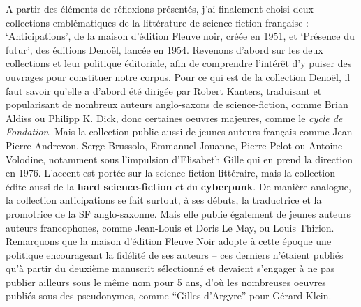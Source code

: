 \documentclass[letterpaper,portrait,12pt]{article}
\begin{document}
\textbf{	}A partir des \'{e}l\'{e}ments de r\'{e}flexions pr\'{e}sent\'{e}s, j'ai finalement choisi deux collections embl\'{e}matiques de la litt\'{e}rature de science fiction fran\c{c}aise : {`}Anticipations', de la maison d'\'{e}dition Fleuve noir, cr\'{e}\'{e}e en 1951, et {`}Pr\'{e}sence du futur', des \'{e}ditions Deno\"{e}l, lanc\'{e}e en 1954. Revenons d'abord sur les deux collections et leur politique \'{e}ditoriale, afin de comprendre l'int\'{e}r\^{e}t d'y puiser des ouvrages pour constituer notre corpus. Pour ce qui est de la collection Deno\"{e}l, il faut savoir qu'elle a d'abord \'{e}t\'{e} dirig\'{e}e par Robert Kanters, traduisant et popularisant de nombreux auteurs anglo-saxons de science-fiction, comme Brian Aldiss ou Philipp K. Dick, donc certaines oeuvres majeures, comme le \emph{cycle de Fondation}. Mais la collection publie aussi de jeunes auteurs fran\c{c}ais comme Jean-Pierre Andrevon, Serge Brussolo, Emmanuel Jouanne, Pierre Pelot ou Antoine Volodine, notamment sous l'impulsion d'Elisabeth Gille qui en prend la direction en 1976. L'accent est port\'{e}e sur la science-fiction litt\'{e}raire, mais la collection \'{e}dite aussi de la \textbf{hard science-fiction} et du \textbf{cyberpunk}. De mani\`{e}re analogue, la collection anticipations se fait surtout, \`{a} ses d\'{e}buts, la traductrice et la promotrice de la SF anglo-saxonne. Mais elle publie \'{e}galement de jeunes auteurs auteurs francophones, comme Jean-Louis et Doris Le May, ou Louis Thirion. Remarquons que la maison d'\'{e}dition Fleuve Noir adopte \`{a} cette \'{e}poque une politique encourageant la fid\'{e}lit\'{e} de ses auteurs -- ces derniers n'\'{e}taient publi\'{e}s qu'\`{a} partir du deuxi\`{e}me manuscrit s\'{e}lectionn\'{e} et devaient s'engager \`{a} ne pas publier ailleurs sous le m\^{e}me nom pour 5 ans, d'où les nombreuses oeuvres publi\'{e}s sous des pseudonymes, comme {``}Gilles d'Argyre'' pour G\'{e}rard Klein.
\end{document}

